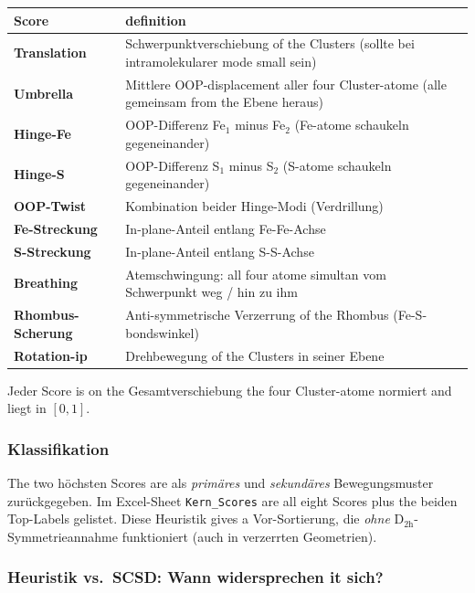 \documentclass[11pt,a4paper,twoside]{article}
\theoremstyle{remark}
\begin{document}
\begin{center}
\begin{tabularx}{\textwidth}{l X}
\toprule
\textbf{Score} & \textbf{definition} \\
\midrule
\textbf{Translation} & Schwerpunktverschiebung of the Clusters
                       (sollte bei intramolekularer mode small sein) \\
\textbf{Umbrella}    & Mittlere OOP-displacement aller four Cluster-atome
                       (alle gemeinsam from the Ebene heraus) \\
\textbf{Hinge-Fe}    & OOP-Differenz Fe$_1$ minus Fe$_2$ (Fe-atome
                       schaukeln gegeneinander) \\
\textbf{Hinge-S}     & OOP-Differenz S$_1$ minus S$_2$ (S-atome
                       schaukeln gegeneinander) \\
\textbf{OOP-Twist}   & Kombination beider Hinge-Modi (Verdrillung) \\
\textbf{Fe-Streckung} & In-plane-Anteil entlang Fe-Fe-Achse \\
\textbf{S-Streckung} & In-plane-Anteil entlang S-S-Achse \\
\textbf{Breathing}   & Atemschwingung: all four atome simultan vom
                       Schwerpunkt weg / hin zu ihm \\
\textbf{Rhombus-Scherung} & Anti-symmetrische Verzerrung of the Rhombus
                       (Fe-S-bondswinkel) \\
\textbf{Rotation-ip} & Drehbewegung of the Clusters in seiner Ebene \\
\bottomrule
\end{tabularx}
\end{center}

Jeder Score is on the Gesamtverschiebung the four Cluster-atome
normiert and liegt in $[0, 1]$.

\subsubsection*{Klassifikation}

The two h\"ochsten Scores are als \emph{prim\"ares} und
\emph{sekund\"ares} Bewegungsmuster zur\"uckgegeben. Im Excel-Sheet
\texttt{Kern\_Scores} are all eight Scores plus the beiden Top-Labels
gelistet. Diese Heuristik gives a Vor-Sortierung, die
\textit{ohne} D$_\mathrm{2h}$-Symmetrieannahme funktioniert (auch in
verzerrten Geometrien).

\subsubsection*{Heuristik vs.\ SCSD: Wann widersprechen it sich?}
\end{document}
